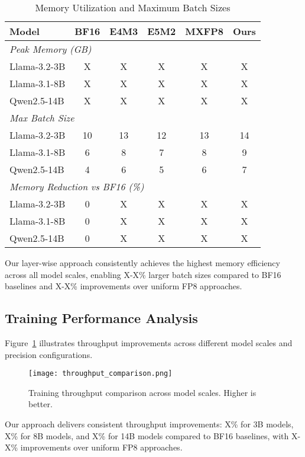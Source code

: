 \documentclass[conference]{IEEEtran}
\begin{document}
\begin{table}[htbp]
\centering
\caption{Memory Utilization and Maximum Batch Sizes}
\begin{tabular}{@{}lccccc@{}}
\toprule
\textbf{Model} & \textbf{BF16} & \textbf{E4M3} & \textbf{E5M2} & \textbf{MXFP8} & \textbf{Ours} \\
\midrule
\multicolumn{6}{l}{\textit{Peak Memory (GB)}} \\
Llama-3.2-3B & X & X & X & X & X \\
Llama-3.1-8B & X & X & X & X & X \\
Qwen2.5-14B & X & X & X & X & X \\
\midrule
\multicolumn{6}{l}{\textit{Max Batch Size}} \\
Llama-3.2-3B & 10 & 13 & 12 & 13 & 14 \\
Llama-3.1-8B & 6 & 8 & 7 & 8 & 9 \\
Qwen2.5-14B & 4 & 6 & 5 & 6 & 7 \\
\midrule
\multicolumn{6}{l}{\textit{Memory Reduction vs BF16 (\%)}} \\
Llama-3.2-3B & 0 & X & X & X & X \\
Llama-3.1-8B & 0 & X & X & X & X \\
Qwen2.5-14B & 0 & X & X & X & X \\
\bottomrule
\end{tabular}
\label{tab:memory_scaling}
\end{table}

Our layer-wise approach consistently achieves the highest memory efficiency across all model scales, enabling X-X\% larger batch sizes compared to BF16 baselines and X-X\% improvements over uniform FP8 approaches.

\subsection{Training Performance Analysis}

Figure~\ref{fig:throughput_comparison} illustrates throughput improvements across different model scales and precision configurations.

\begin{figure}[htbp]
    \centering
    \texttt{[image: throughput\_comparison.png]}
    \caption{Training throughput comparison across model scales. Higher is better.}
    \label{fig:throughput_comparison}
\end{figure}

Our approach delivers consistent throughput improvements: X\% for 3B models, X\% for 8B models, and X\% for 14B models compared to BF16 baselines, with X-X\% improvements over uniform FP8 approaches.
\end{document}
